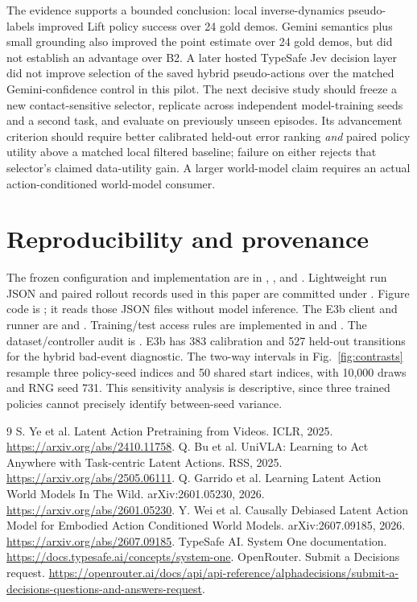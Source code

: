 \documentclass[11pt]{article}
\begin{document}
The evidence supports a bounded conclusion: local inverse-dynamics
pseudo-labels improved Lift policy success over 24 gold demos. Gemini
semantics plus small grounding also improved the point estimate over 24
gold demos, but did not establish an advantage over B2. A later hosted
TypeSafe Jev decision layer did not improve selection of the saved hybrid
pseudo-actions over the matched Gemini-confidence control in this pilot.
The next decisive study should freeze a new contact-sensitive selector,
replicate across independent model-training seeds and a second task, and
evaluate on previously unseen episodes. Its advancement criterion should
require better calibrated held-out error ranking \emph{and} paired policy
utility above a matched local filtered baseline; failure on either rejects
that selector's claimed data-utility gain. A larger world-model claim
requires an actual action-conditioned world-model consumer.

\appendix
\section{Reproducibility and provenance}
The frozen configuration and implementation are in ,
, and . Lightweight run JSON and
paired rollout records used in this paper are committed under
. Figure code is
; it reads those JSON files without
model inference. The E3b client and runner are
 and
. Training/test access rules are
implemented in  and
. The dataset/controller audit is
. E3b has 383 calibration
and 527 held-out transitions for the hybrid bad-event diagnostic. The
two-way intervals in Fig.~\ref{fig:contrasts} resample three policy-seed
indices and 50 shared start indices, with 10,000 draws and RNG seed 731.
This sensitivity analysis is descriptive, since three trained policies
cannot precisely identify between-seed variance.

\begin{thebibliography}{9}
 S. Ye et al. Latent Action Pretraining from Videos.
ICLR, 2025. \url{https://arxiv.org/abs/2410.11758}.
 Q. Bu et al. UniVLA: Learning to Act Anywhere
with Task-centric Latent Actions. RSS, 2025.
\url{https://arxiv.org/abs/2505.06111}.
 Q. Garrido et al. Learning Latent Action
World Models In The Wild. arXiv:2601.05230, 2026.
\url{https://arxiv.org/abs/2601.05230}.
 Y. Wei et al. Causally Debiased Latent
Action Model for Embodied Action Conditioned World Models.
arXiv:2607.09185, 2026. \url{https://arxiv.org/abs/2607.09185}.
 TypeSafe AI. System One documentation.
\url{https://docs.typesafe.ai/concepts/system-one}.
 OpenRouter. Submit a Decisions request.
\url{https://openrouter.ai/docs/api/api-reference/alphadecisions/submit-a-decisions-questions-and-answers-request}.
\end{thebibliography}
\end{document}
